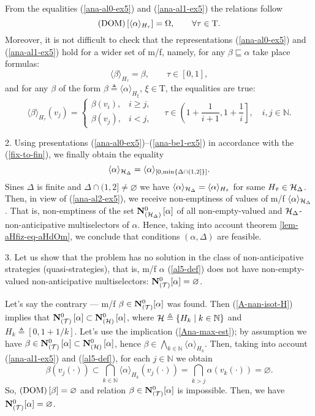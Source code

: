 \documentclass[sn-mathphys,Numbered,pdflatex]{sn-jnl}%
\theoremstyle{thmstyleone}%
\theoremstyle{thmstyletwo}%
\theoremstyle{thmstylethree}%
\renewcommand{\ge}{\geqslant}%
\newcommand{\beq}{\begin{equation}}
\newcommand{\eeq}{\end{equation}}
\newcommand{\mydef}{\mathrel{\triangleq}}%
\newcommand{\myLe}{\mathrel{\sqsubseteq}}%
\newcommand{\NA}{\ensuremath{\mathbb N}}%
\newcommand{\naOm}{\ensuremath{\Omega}}%
\newcommand{\naT}{\ensuremath{\mathrm{T}}}%
\newcommand{\naTc}{\ensuremath{\mathcal{T}}}%
\newcommand{\naN}{\AnaN{\naTc}{}}%
\newcommand{\AnaN}[2]{\mathbf{N}_{(#1)}\setbox0=\hbox{\text{$#2$}}\ifdim\wd0=0pt\else\left[{#2}\right]\fi}%
\newcommand{\AnaNO}[2]{\mathbf{N}^0_{(#1)}\setbox0=\hbox{\text{$#2$}}\ifdim\wd0=0pt\else\left[{#2}\right]\fi}%
\newcommand{\nado}[1]{(\mathrm{DOM})\setbox0=\hbox{\text{$#1$}}\ifdim\wd0=0pt\else\left[{#1}\right]\fi}%
\newcommand{\naNO}[1]{\naN^0\setbox0=\hbox{\text{$#1$}}\ifdim\wd0=0pt\else[{#1}]\fi}%
\newcommand{\Ana}[2]{\ensuremath{\langle{#1}\rangle_{#2}}}%
\newcommand{\fref}[1]{{\rm(\ref{#1})}}   %
\begin{document}
From the equalities \fref{ana-al0-ex5} and \fref{ana-al1-ex5} the relations follow
\beq\label{ana-al2-ex5}
\nado{\Ana{\alpha}{H_\tau}}=\naOm,\qquad\forall\tau\in\naT.
\eeq
Moreover, it is not difficult to check that the representations \fref{ana-al0-ex5} and \fref{ana-al1-ex5} hold for a wider set of m/f, namely, for any $\beta\myLe\alpha$ take place formulas:
\beq\label{ana-be0-ex5}
\Ana{\beta}{H_\tau}=\beta, \qquad \tau\in[0,1],
\eeq
and for any $\beta$ of the form $\beta\mydef\Ana{\alpha}{H_\xi}$, $\xi\in\naT$, the equalities are true:
\beq\label{ana-be1-ex5}
\Ana{\beta}{H_\tau}(v_j)=
\begin{cases}
\beta(v_i),&i\ge j,\\
\beta(v_j),&i<j,
\end{cases}
\quad\ \tau\in\left(1+\frac1{i+1},1+\frac1i\right],\quad i,j\in\NA.
\eeq

2. Using presentations \fref{ana-al0-ex5}--\fref{ana-be1-ex5} in accordance with the \fref{fix-to-fin}, we finally obtain the equality
\beq\label{Ana-com5}
\Ana{\alpha}{{\cal H}_\Delta}=\Ana{\alpha}{[0,\min\{\Delta\cap(1,2]\}]}.
\eeq
Sines $\Delta$ is finite and $\Delta\cap(1,2]\neq\varnothing$ we have $\Ana{\alpha}{{\cal H}_\Delta}=\Ana{\alpha}{H_{\bar\tau}}$ for same $H_{\bar\tau}\in{\cal H}_\Delta$.
Then, in view of \fref{ana-al2-ex5}, we receive non-emptiness of values of m/f $\Ana{\alpha}{{\cal H}_\Delta}$.
That is, non-emptiness of the set $\AnaNO{{\cal H}_\Delta}\alpha$ of all non-empty-valued and ${{\cal H}_\Delta}$-non-anticipative multiselectors of $\alpha$.
Hence, taking into account theorem \ref{lem-aHfiz-eq-aHdOm}, we conclude that conditions $(\alpha, \Delta)$ are feasible.

3.
Let us show that the problem has no solution in the class of non-anticipative strategies (quasi-strategies), that is, m/f $\alpha$ \fref{al5-def} does not have non-empty-valued non-anticipative multiselectors: $\naNO\alpha=\varnothing$.

Let's say the contrary --- m/f $\beta\in\naNO\alpha$ was found.
Then \fref{A-nan-isot-H} implies that $\AnaNO\naTc\alpha\subset\AnaNO{\cal H}\alpha$, where ${\cal H}\mydef\{H_k\mid k\in\NA\}$ and $H_k\mydef[0,1+1/k]$.
Let's use the implication \fref{Ana-max-est}; by assumption we have $\beta\in\AnaNO\naTc\alpha\subset\AnaNO{\cal H}\alpha$, hence $\beta\in\bigwedge_{k\in\NA}\Ana{\alpha}{ H_k}$.
Then, taking into account \fref{ana-al1-ex5} and \fref{al5-def}, for each $j\in\NA$ we obtain
$$
\beta(v_j(\cdot))\subset\bigcap_{k\in\NA}\Ana{\alpha}{H_k}(v_j(\cdot))=\bigcap_{k>j}\alpha(v_k(\cdot))=\varnothing.
$$
So, $\nado{\beta}=\varnothing$ and relation $\beta\in\naNO\alpha$ is impossible.
Then, we have $\naNO\alpha=\varnothing$.
\end{document}
